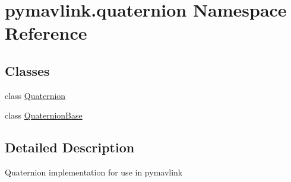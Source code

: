 \hypertarget{namespacepymavlink_1_1quaternion}{}\section{pymavlink.\+quaternion Namespace Reference}
\label{namespacepymavlink_1_1quaternion}
\subsection*{Classes}
\begin{DoxyCompactItemize}
\item 
class \hyperlink{classpymavlink_1_1quaternion_1_1Quaternion}{Quaternion}
\item 
class \hyperlink{classpymavlink_1_1quaternion_1_1QuaternionBase}{Quaternion\+Base}
\end{DoxyCompactItemize}


\subsection{Detailed Description}
\begin{DoxyVerb}Quaternion implementation for use in pymavlink
\end{DoxyVerb}
 